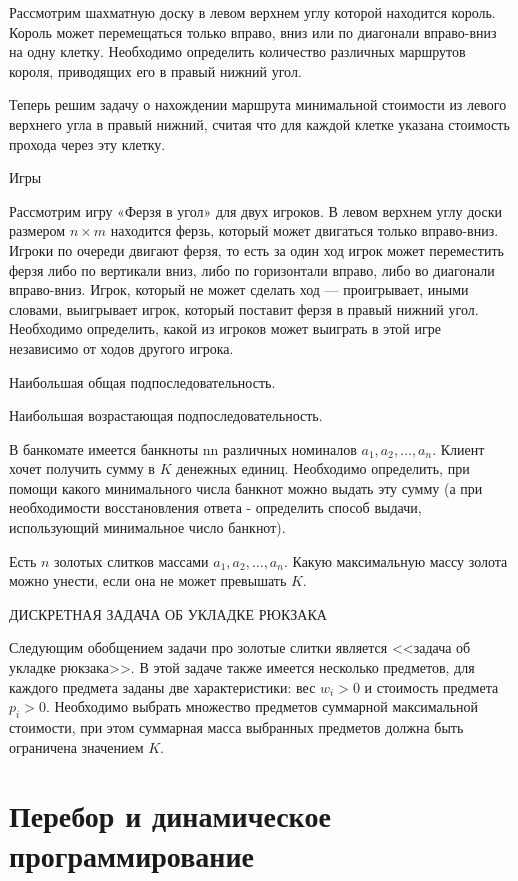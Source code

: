 \documentclass[14pt]{book}
\begin{document}
Рассмотрим шахматную доску в левом верхнем углу которой находится король. Король может перемещаться только вправо, вниз или по диагонали вправо-вниз на одну клетку. Необходимо определить количество различных маршрутов короля, приводящих его в правый нижний угол.

Теперь решим задачу о нахождении маршрута минимальной стоимости из левого верхнего угла в правый нижний, считая что для каждой клетке указана стоимость прохода через эту клетку.

Игры

Рассмотрим игру «Ферзя в угол» для двух игроков. В левом верхнем углу доски размером $n \times m$ 
находится ферзь, который может двигаться только вправо-вниз. Игроки по очереди двигают ферзя, то есть 
за один ход игрок может переместить ферзя либо по вертикали вниз, либо по горизонтали вправо, либо во 
диагонали вправо-вниз. Игрок, который не может сделать ход — проигрывает, иными словами, выигрывает 
игрок, который поставит ферзя в правый нижний угол. Необходимо определить, какой из игроков может 
выиграть в этой игре независимо от ходов другого игрока.

Наибольшая общая подпоследовательность.

Наибольшая возрастающая подпоследовательность.

В банкомате имеется банкноты nn различных номиналов $a_1, a_2, \ldots, a_n$. Клиент хочет получить сумму в $K$ денежных единиц. Необходимо определить, при помощи какого минимального числа банкнот можно выдать эту сумму (а при необходимости восстановления ответа - определить способ выдачи, использующий минимальное число банкнот).

Есть $n$ золотых слитков массами $a_1, a_2, \ldots, a_n$. Какую максимальную массу золота можно унести, если она не может превышать $K$.

ДИСКРЕТНАЯ ЗАДАЧА ОБ УКЛАДКЕ РЮКЗАКА

Следующим обобщением задачи про золотые слитки является <<задача об укладке рюкзака>>. В этой задаче также имеется несколько предметов, для каждого предмета заданы две характеристики: вес $w_i > 0$ и стоимость предмета $p_i > 0$. Необходимо выбрать множество предметов суммарной максимальной стоимости, при этом суммарная масса выбранных предметов должна быть ограничена значением $K$.

\chapter{Перебор и динамическое программирование}
\end{document}
